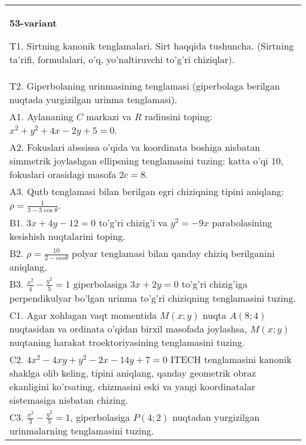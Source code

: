 \documentclass{article}
\begin{document}
\begin{tabular}{m{17cm}}
\textbf{53-variant}
\newline

T1. Sirtning kanonik tenglamalari. Sirt haqqida tushuncha. (Sirtning ta'rifi, formulalari, o'q, yo'naltiruvchi to'g'ri chiziqlar).\\

T2. Giperbolaning urinmasining tenglamasi (giperbolaga berilgan nuqtada yurgizilgan urinma tenglamasi).\\

A1. Aylananing $C$ markazi va $R$ radiusini toping: $x^2+y^2+4x-2y+5=0$.\\

A2. Fokuslari abssissa o'qida va koordinata boshiga nisbatan simmetrik joylashgan ellipsning tenglamasini tuzing: katta o'qi $10$, fokuslari orasidagi masofa $2c=8$.\\

A3. Qutb tenglamasi bilan berilgan egri chiziqning tipini aniqlang: $\rho=\frac{1}{3-3\cos\theta}$.\\

B1. $3x + 4y - 12 = 0$ to'g'ri chizig'i va $y^{2} = - 9x$ parabolasining kesishish nuqtalarini toping.\\

B2. $\rho = \frac{10}{2 - cos\theta}$ polyar tenglamasi bilan qanday chiziq berilganini aniqlang.  \\

B3. $\frac{x^{2}}{4} - \frac{y^{2}}{5} = 1$ giperbolasiga $3x + 2y = 0$ to'g'ri chizig'iga perpendikulyar bo'lgan urinma to'g'ri chiziqning tenglamasini tuzing.\\

C1. Agar xohlagan vaqt momentida $M(x;y)$ nuqta $A(8;4)$ nuqtasidan va ordinata o'qidan birxil masofada joylashsa, $M(x;y)$ nuqtaning harakat troektoriyasining tenglamasini tuzing.  \\

C2. $4x^{2} - 4xy + y^{2} - 2x - 14y + 7 = 0$ ITECH tenglamasini kanonik shaklga olib keling, tipini aniqlang, qanday geometrik obraz ekanligini ko'rsating, chizmasini eski va yangi koordinatalar sistemasiga nisbatan chizing.  \\

C3. $\frac{x^{2}}{3} - \frac{y^{2}}{5} = 1$, giperbolasiga $P(4;2)$ nuqtadan yurgizilgan urinmalarning tenglamasini tuzing.  \\

\end{tabular}
\vspace{1cm}
\end{document}
